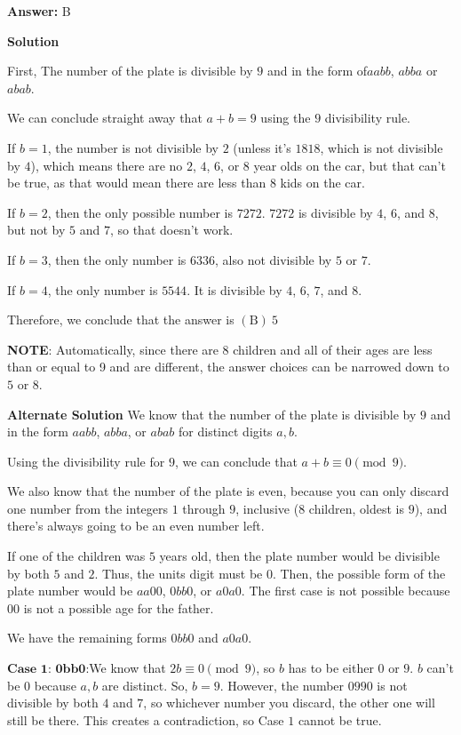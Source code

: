 \begin{enumerate}
 \textbf{Answer: }B



\textbf{Solution}

First, The number of the plate is divisible by $9$ and in the form of$aabb$, $abba$ or $abab$. 

 We can conclude straight away that $a+b= 9$ using the $9$ divisibility rule. 

 If $b=1$, the number is not divisible by $2$ (unless it's $1818$, which is not divisible by $4$), which means there are no $2$, $4$, $6$, or $8$ year olds on the car, but that can't be true, as that would mean there are less than $8$ kids on the car. 

 If $b=2$, then the only possible number is $7272$. $7272$ is divisible by $4$, $6$, and $8$, but not by $5$ and $7$, so that doesn't work. 

 If $b=3$, then the only number is $6336$, also not divisible by $5$ or $7$. 

 If $b=4$, the only number is $5544$. It is divisible by $4$, $6$, $7$, and $8$. 

 Therefore, we conclude that the answer is $\mathrm{(B)}\ 5$

 \textbf{NOTE}: Automatically, since there are 8 children and all of their ages are less than or equal to 9 and are different, the answer choices can be narrowed down to $5$ or $8$.

 \textbf{Alternate Solution} We know that the number of the plate is divisible by $9$ and in the form $aabb$, $abba$, or $abab$ for distinct digits $a,b$.

 Using the divisibility rule for $9$, we can conclude that $a+b\equiv 0\pmod{9}$.

 We also know that the number of the plate is even, because you can only discard one number from the integers $1$ through $9$, inclusive ($8$ children, oldest is $9$), and there's always going to be an even number left.

 If one of the children was $5$ years old, then the plate number would be divisible by both $5$ and $2$. Thus, the units digit must be $0$. Then, the possible form of the plate number would be $aa00$, $0bb0$, or $a0a0$. The first case is not possible because $00$ is not a possible age for the father.

 We have the remaining forms $0bb0$ and $a0a0$.

 $\textbf{Case 1: 0bb0:}$We know that $2b\equiv 0\pmod{9}$, so $b$ has to be either $0$ or $9$. $b$ can't be $0$ because $a, b$ are distinct. So, $b=9$. However, the number $0990$ is not divisible by both $4$ and $7$, so whichever number you discard, the other one will still be there.  This creates a contradiction, so Case $1$ cannot be true.


\end{enumerate}
